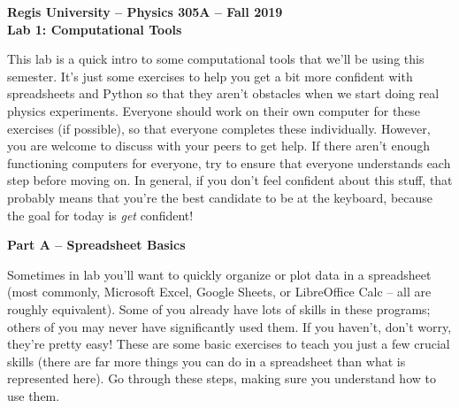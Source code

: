 \documentclass[10pt]{article}
\begin{document}
\begin{center}
{\bf{Regis University -- Physics 305A -- Fall 2019}} \\
{\bf{Lab 1: Computational Tools}} \\
\medskip
\end{center}

This lab is a quick intro to some computational tools that we'll be using this semester. It's just some exercises to help you get a bit more confident with spreadsheets and Python so that they aren't obstacles when we start doing real physics experiments. Everyone should work on their own computer for these exercises (if possible), so that everyone completes these individually. However, you are welcome to discuss with your peers to get help. If there aren't enough functioning computers for everyone, try to ensure that everyone understands each step before moving on. In general, if you don't feel confident about this stuff, that probably means that you're the best candidate to be at the keyboard, because the goal for today is \textit{get} confident!

\begin{center}
{\bf{Part A -- Spreadsheet Basics}} 
\end{center}

Sometimes in lab you'll want to quickly organize or plot data in a spreadsheet (most commonly, Microsoft Excel, Google Sheets, or LibreOffice Calc -- all are roughly equivalent). Some of you already have lots of skills in these programs; others of you may never have significantly used them. If you haven't, don't worry, they're pretty easy! These are some basic exercises to teach you just a few crucial skills (there are far more things you can do in a spreadsheet than what is represented here). Go through these steps, making sure you understand how to use them.
\end{document}
